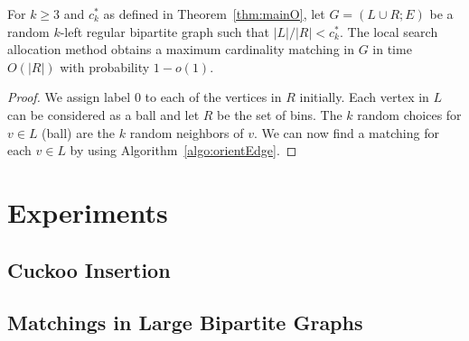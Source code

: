 \begin{corollary}
For $k\ge 3$ and $c^*_{k}$ as defined in Theorem~\ref{thm:mainO}, let $G=(L\cup R;E)$ be a random $k$-left regular bipartite graph such that ${|L| / |R| }<c^*_{k}$.  The local search allocation method obtains a maximum cardinality matching in $G$ in time $O(|R|)$ with probability $1-o(1)$.
\end{corollary}
\begin{proof}
We assign label $0$ to each of the vertices in $R$ initially. Each vertex in $L$ can be considered as a ball and let $R$ be the set of bins. The $k$ random choices for $v\in L$ (ball) are the $k$ random neighbors of $v$. We can now find a matching for each $v\in L$ by using Algorithm~\ref{algo:orientEdge}.
\end{proof}
\section{Experiments}
\subsection{ Cuckoo Insertion}

\subsection{Matchings in Large Bipartite Graphs} 



